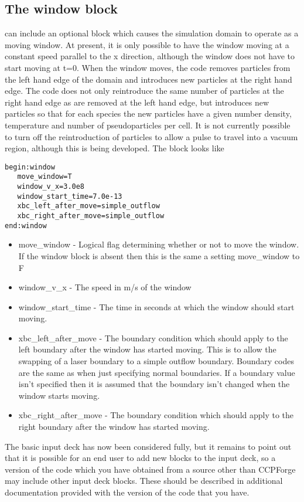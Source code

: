 \documentclass[12pt,a4paper]{article}
\newcommand{\simpleboxverbatim}{\begin{Verbatim}[obeytabs=true,frame=single,
  framerule=0.5mm,rulecolor=\color{warwickmid},formatcom=\color{black}]}
\newcommand{\EPOCH}{{\color{warwickdark}\fontfamily{phv}\selectfont{EPOCH}}}
\begin{document}
\subsection{The window block}
{\EPOCH} can include an optional block which causes the simulation domain to
operate as a moving window. At present, it is only possible to have the window
moving at a constant speed parallel to the x direction, although the window
does not have to start moving at t=0. When the window moves, the code removes
particles from the left hand edge of the domain and introduces new particles
at the right hand edge. The code does not only reintroduce the same number of
particles at the right hand edge as are removed at the left hand edge, but
introduces new particles so that for each species the new particles have a
given number density, temperature and number of pseudoparticles per cell. It
is not currently possible to turn off the reintroduction of particles to allow
a pulse to travel into a vacuum region, although this is being developed. The
block looks like\\
\simpleboxverbatim
begin:window
   move_window=T
   window_v_x=3.0e8
   window_start_time=7.0e-13
   xbc_left_after_move=simple_outflow
   xbc_right_after_move=simple_outflow
end:window
\end{Verbatim}

\begin{itemize}
\item move\_window - Logical flag determining whether or not to move the
  window. If the window block is absent then this is the same a setting
  move\_window to F
\item window\_v\_x - The speed in m/s of the window
\item window\_start\_time - The time in seconds at which the window should
  start moving.
\item xbc\_left\_after\_move - The boundary condition which should apply to
  the left boundary after the window has started moving. This is to allow the
  swapping of a laser boundary to a simple outflow boundary. Boundary codes
  are the same as when just specifying normal boundaries. If a boundary value
  isn't specified then it is assumed that the boundary isn't changed when the
  window starts moving.
\item xbc\_right\_after\_move - The boundary condition which should apply to
  the right boundary after the window has started moving.
\end{itemize}

The basic input deck has now been considered fully, but it remains to point
out that it is possible for an end user to add new blocks to the input deck,
so a version of the code which you have obtained from a source other than
CCPForge may include other input deck blocks. These should be described in
additional documentation provided with the version of the code that you have.
\end{document}
